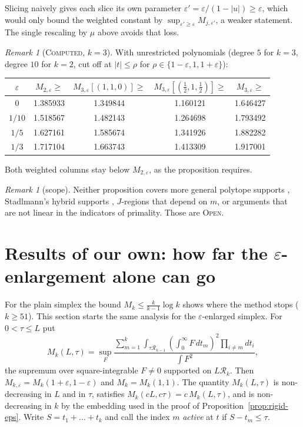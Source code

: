 \documentclass[11pt]{amsart}
\theoremstyle{definition}
\theoremstyle{remark}
\newtheorem{remark}[theorem]{Remark}
\newcommand{\lbl}[1]{\textup{\textsc{#1}}}
\newcommand{\R}{\mathcal{R}}
\begin{document}
Slicing naively gives each slice its own parameter
$\varepsilon'=\varepsilon/(1-|u|)\ge\varepsilon$, which would only bound the
weighted constant by $\sup_{\varepsilon'\ge\varepsilon}M_{j,\varepsilon'}$, a
weaker statement. The single rescaling by $\mu$ above avoids that loss.

\begin{remark}[\lbl{Computed}, $k=3$]
With unrestricted polynomials (degree $5$ for $k=3$, degree $10$ for $k=2$,
cut off at $|t|\le\rho$ for $\rho\in\{1-\varepsilon,1,1+\varepsilon\}$):
\begin{center}
\begin{tabular}{@{}ccccc@{}}
\toprule
$\varepsilon$ & $M_{2,\varepsilon}\ge$ & $M_{3,\varepsilon}[(1,1,0)]\ge$ & $M_{3,\varepsilon}[(\frac12,1,\frac12)]\ge$ & $M_{3,\varepsilon}\ge$\\
\midrule
$0$ & 1.385933 & 1.349844 & 1.160121 & 1.646427\\
$1/10$ & 1.518567 & 1.482143 & 1.264698 & 1.793492\\
$1/5$ & 1.627161 & 1.585674 & 1.341926 & 1.882282\\
$1/3$ & 1.717104 & 1.663743 & 1.413309 & 1.917001\\
\bottomrule
\end{tabular}
\end{center}
Both weighted columns stay below $M_{2,\varepsilon}$, as the proposition
requires.
\end{remark}

\begin{remark}[scope]
Neither proposition covers more general polytope supports
\cite[\S3]{Pol14b}, Stadlmann's hybrid supports \cite{Sta26}, $J$-regions
that depend on $m$, or arguments that are not linear in the indicators of
primality. Those are \lbl{Open}.
\end{remark}

\section{Results of our own: how far the \texorpdfstring{$\varepsilon$}{epsilon}-enlargement alone can go}\label{sec:epsfloor}

For the plain simplex the bound $M_k\le\frac{k}{k-1}\log k$ shows where the
method stops ($k\ge51$). This section starts the same analysis for the
$\varepsilon$-enlarged simplex. For $0<\tau\le L$ put
\[
M_k(L,\tau)=\sup_F\frac{\sum_{m=1}^k\int_{\tau\R_{k-1}}\left(\int_0^\infty F\,dt_m\right)^2\prod_{i\ne m}dt_i}{\int F^2},
\]
the supremum over square-integrable $F\ne0$ supported on $L\R_k$. Then
$M_{k,\varepsilon}=M_k(1+\varepsilon,1-\varepsilon)$ and $M_k=M_k(1,1)$. The
quantity $M_k(L,\tau)$ is non-decreasing in $L$ and in $\tau$, satisfies
$M_k(cL,c\tau)=c\,M_k(L,\tau)$, and is non-decreasing in $k$ by the embedding
used in the proof of Proposition~\ref{prop:rigid-eps}. Write
$S=t_1+\dots+t_k$ and call the index $m$ \emph{active} at $t$ if
$S-t_m\le\tau$.
\end{document}
